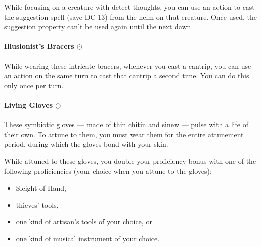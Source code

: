         While focusing on a creature with detect thoughts, you can use an action to cast the suggestion spell (save DC 13) from the helm on that creature.
        Once used, the suggestion property can't be used again until the next dawn.
    \paragraph{Illusionist's Bracers $\odot$}
        While wearing these intricate bracers, whenever you cast a cantrip, you can use an action on the same turn to cast that cantrip a second time.
        You can do this only once per turn.
    \paragraph{Living Gloves $\odot$}
        These symbiotic gloves --- made of thin chitin and sinew --- pulse with a life of their own.
        To attune to them, you must wear them for the entire attunement period, during which the gloves bond with your skin.

        While attuned to these gloves, you double your proficiency bonus with one of the following proficiencies (your choice when you attune to the gloves):
        \begin{itemize}
            \item Sleight of Hand,
            \item thieves' tools,
            \item one kind of artisan's tools of your choice, or
            \item one kind of musical instrument of your choice.
        \end{itemize}

